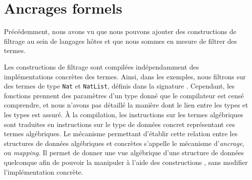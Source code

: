 

\section{Ancrages formels}
\label{subsec:mapping}

Précédemment, nous avons vu que nous pouvons ajouter des constructions de
filtrage au sein de langages hôtes et que nous sommes en mesure de filtrer des
termes. %

Les constructions de filtrage sont compilées indépendamment des implémentations
concrètes des termes. Ainsi, dans les exemples, nous filtrons sur des termes
de type \texttt{Nat} et \texttt{NatList}, définis dans la signature {\gom}.
Cependant, les fonctions {\java} prennent des paramètres d'un type donné que
le compilateur {\java} est censé comprendre, et nous n'avons pas détaillé la
manière dont le lien entre les types {\tom} et les types {\java} est assuré.
À la compilation, les instructions sur les
termes algébriques sont traduites en instructions sur le type de données
concret représentant ces termes algébriques. Le mécanisme permettant d'établir
cette relation entre les structures de données algébriques et concrètes
s'appelle le mécanisme d'\emph{ancrage}, ou \emph{mapping}. Il permet de donner une
vue algébrique d'une structure de données quelconque afin de pouvoir la
manipuler à l'aide des constructions {\tom}, sans modifier l'implémentation
concrète.

